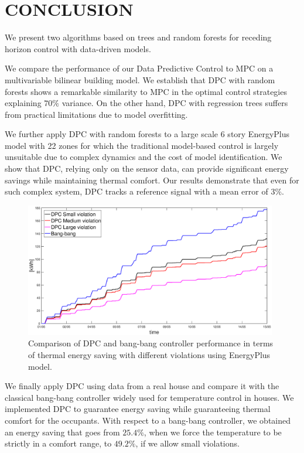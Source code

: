 \section{CONCLUSION}
\label{S:conclusion}

We present two algorithms based on trees and random forests for receding horizon control with data-driven models.

We compare the performance of our Data Predictive Control to MPC on a multivariable bilinear building model. We establish that DPC with random forests shows a remarkable similarity to MPC in the optimal control strategies explaining $70\%$ variance. On the other hand, DPC with regression trees suffers from practical limitations due to model overfitting.

We further apply DPC with random forests to a large scale 6 story EnergyPlus model with 22 zones for which the traditional model-based control is largely unsuitable due to complex dynamics and the cost of model identification. We show that DPC, relying only on the sensor data, can provide significant energy savings while maintaining thermal comfort. Our results demonstrate that even for such complex system, DPC tracks a reference signal with a mean error of $3\%$.

\begin{figure}[t!]
	\begin{center}
		\includegraphics[width=26pc]{figures/Energy_all_EnergyPlus.eps}
	\end{center}
	\caption{Comparison of DPC and bang-bang controller performance in terms of thermal energy saving with different violations using EnergyPlus model.}
	\label{F:comparison_all_energy_E+}
\end{figure}

We finally apply DPC using data from a real house and compare it with the classical bang-bang controller widely used for temperature control in houses. We implemented DPC to guarantee energy saving while guaranteeing thermal comfort for the occupants. With respect to a bang-bang controller, we obtained an energy saving that goes from $25.4\%$, when we force the temperature to be strictly in a comfort range, to $49.2\%$, if we allow small violations.

